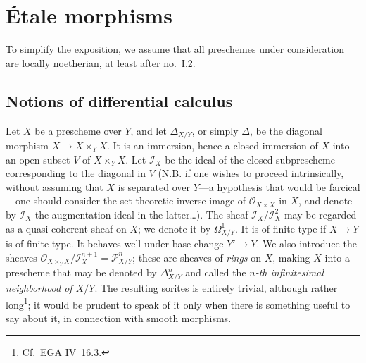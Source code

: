 \documentclass[11pt,oneside]{amsbook}
\begin{document}
\tableofcontents

\mainmatter
\setcounter{chapter}{0}
\chapter{Étale morphisms}
\label{I}

To simplify the exposition, we assume that all preschemes under
consideration are locally noetherian, at least after no.~I.2.

\section{Notions of differential calculus}
\label{I.1}

Let \(X\) be a prescheme over \(Y\), and let \(\Delta_{X/Y}\), or simply
\(\Delta\),\label{indnot:ab} be the diagonal morphism
\(X\to X\times_Y X\).  It is an
immersion, hence a closed immersion of \(X\) into an open subset \(V\) of
\(X\times_Y X\).  Let \(\mathcal I_X\) be the ideal of the closed
subprescheme corresponding to the diagonal in \(V\) (N.B. if one wishes to
proceed intrinsically, without assuming that \(X\) is separated over
\(Y\)---a hypothesis that would be farcical---one should consider the
set-theoretic inverse image of \(\mathcal O_{X\times X}\) in \(X\), and
denote by \(\mathcal I_X\) the augmentation ideal in the latter\ldots).
The sheaf \(\mathcal I_X/\mathcal I_X^2\) may be regarded as a
quasi-coherent sheaf on \(X\); we denote it by \(\Omega^1_{X/Y}\).  It is
\label{indnot:ac}
of finite type if \(X\to Y\) is of finite type.  It behaves well under base
change \(Y'\to Y\).  We also introduce the sheaves
\(\mathcal O_{X\times_Y X}/\mathcal I_X^{n+1}=\mathcal P^n_{X/Y}\);\label{indnot:ad} these
are sheaves of \emph{rings} on \(X\), making \(X\) into a prescheme that
may be denoted by \(\Delta^n_{X/Y}\)\label{indnot:ae} and called the \emph{\(n\)-th
infinitesimal neighborhood of \(X/Y\)}.  The resulting sorites is entirely
trivial, although rather long\footnote{Cf.\ EGA IV~16.3.}; it would be
prudent to speak of it only when there is something useful to say about it,
in connection with smooth morphisms.
\end{document}

